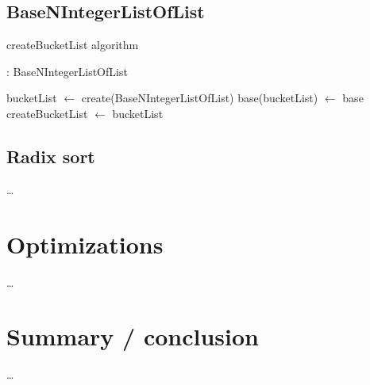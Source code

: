\documentclass[book, nodocumentinfo]{upmethodology-document}
\begin{document}
\section{BaseNIntegerListOfList}

\begin{algorithm}[H]
	\label{algo:basenintegerlistoflist-create-bucket-list}
	\caption{createBucketList algorithm}

	\begin{algorithmic}
		 : BaseNIntegerListOfList

		\State bucketList \(\leftarrow \) create(BaseNIntegerListOfList)
		\State base(bucketList) \(\leftarrow \) base
		\State createBucketList \(\leftarrow \) bucketList

		\EndFunction
	\end{algorithmic}
\end{algorithm}

\section{Radix sort}

…

\chapter{Optimizations}

…

\chapter{Summary / conclusion}

…



{}
\end{document}
